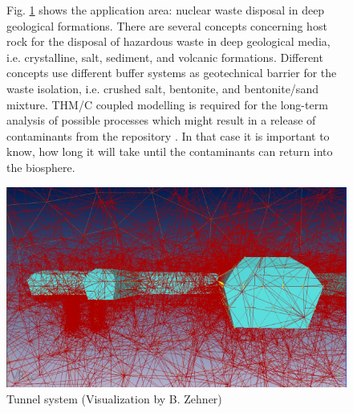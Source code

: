 \begin{figure}[!htb]
\begin{minipage}[t]{0.48\textwidth}
Fig. \ref{fig:apl1} shows the application area: nuclear waste disposal in deep geological formations.
There are several concepts concerning host rock for the disposal of hazardous waste in deep geological media, i.e. crystalline, salt, sediment, and volcanic formations. Different concepts use different buffer systems as geotechnical barrier for the waste isolation, i.e. crushed salt, bentonite, and bentonite/sand mixture. THM/C coupled modelling is required for the long-term analysis of possible processes which might result in a release of contaminants from the repository \cite{NowakEtAl:2011}. In that case it is important to know, how long it will take until the contaminants can return into the biosphere.
\end{minipage}
\hspace{0.02\textwidth}
\begin{minipage}[t]{0.48\textwidth}
\vspace{1.5cm}
\includegraphics[scale=0.25]{figures/intro1}
\caption{Tunnel system (Visualization by B. Zehner)}
\label{fig:apl1}
\end{minipage}
\end{figure}

\vspace{-3cm}

